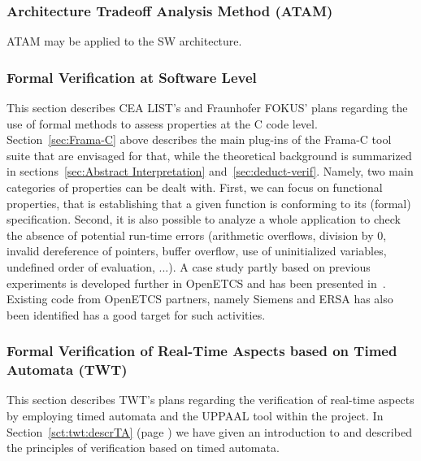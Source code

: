 \documentclass{template/openetcs_report}
\begin{document}
\subsubsection{Architecture Tradeoff Analysis Method (ATAM)}	
\label{sec:atam-openETCS}
ATAM may be applied to the SW architecture.

\subsubsection{Formal Verification at Software Level}
\label{sec:form-verif-soft-openETCS}
This section describes CEA LIST's and Fraunhofer FOKUS' plans regarding the use
of formal methods to assess properties at the C code level. 
Section~\ref{sec:Frama-C} above describes the main plug-ins of the Frama-C
tool suite that are envisaged for that, while the theoretical background is
summarized in sections~\ref{sec:Abstract Interpretation}
and~\ref{sec:deduct-verif}. Namely, two main categories of properties
can be dealt with. First, we can focus on functional properties, that is
establishing that a given function is conforming to its (formal) specification.
Second, it is also possible to analyze a whole application to check the absence
of potential run-time errors (arithmetic overflows, division by 0, invalid
dereference of pointers, buffer overflow, use of uninitialized variables,
undefined order of evaluation, ...). A case study partly based on previous
experiments is developed further in OpenETCS and has been presented
in~\cite{Gerlach.2013}. Existing code from OpenETCS partners,
namely Siemens and ERSA has also been identified has a good target for
such activities.

\subsubsection{Formal Verification of Real-Time Aspects based on Timed Automata (TWT)}
\label{sec:real-time-TA-openETCS}

This section describes TWT's plans regarding the verification of
real-time aspects by employing timed automata and the UPPAAL tool
within the project. In Section~\ref{sct:twt:descrTA} (page
\pageref{sct:twt:descrTA}) we have given an introduction to and
described the principles of verification based on timed automata.
\end{document}
